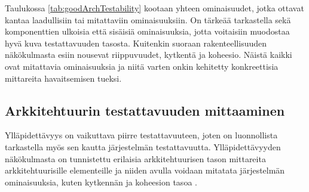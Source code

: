 \documentclass[finnish]{tktltiki2}
\numberwithin{table}{section}
\theoremstyle{definition}
\theoremstyle{remark}
\begin{document}
\begin{table}[H]
	\centering
	\setlength{\extrarowheight}{10pt}%
	\caption{Hyvään testattavuuteen vaikuttavat ominaisuudet jaoteltuna kahteen eri luokaan: laadulliset ja metriset.}
	\label{tab:goodArchTestability}
\end{table}

\noindent
Taulukossa \ref{tab:goodArchTestability} kootaan yhteen ominaisuudet, jotka ottavat kantaa laadullisiin tai mitattaviin ominaisuuksiin. On tärkeää tarkastella sekä komponenttien ulkoisia että sisäisiä ominaisuuksia, jotta voitaisiin muodostaa hyvä kuva testattavuuden tasosta. Kuitenkin suoraan rakenteellisuuden näkökulmasta esiin nousevat riippuvuudet, kytkentä ja koheesio. Näistä kaikki ovat mitattavia ominaisuuksia ja niitä varten onkin kehitetty konkreettisia mittareita havaitsemisen tueksi.  


\subsection{Arkkitehtuurin testattavuuden mittaaminen} \label{arch_testability_measurement}

Ylläpidettävyys on vaikuttava piirre testattavuuteen, joten on luonnollista tarkastella myös sen kautta järjestelmän testattavuutta. Ylläpidettävyyden näkökulmasta on tunnistettu erilaisia arkkitehtuurisen tason mittareita arkkitehtuurisille elementeille ja niiden avulla voidaan mitatata järjestelmän ominaisuuksia, kuten kytkennän ja koheesion tasoa \citep{bengtsson1998towards}.  

\iffalse


\begin{itemize}
	\item metodien määrä elementin rajapinnassa
	\item paikkamerkkien (placeholder) määrä arkkitehtuurisille elementeille, joiden avulla elementti parametrisoidaan
	\item elementistä lähtevien viestien määrä
	\item elementtityyppien määrä, joita tarkasteltava elementti toteuttaa (implement)
	\item elementtien määrä, jotka toteuttavat tarkasteltavan elementin tyypin
	\item saatavilla olevien metodien lukumäärä muista elementeistä, jotka ovat yhteydessä tarkasteltavaan elementtiin
	\item elementin metodien ja parametrien määrä
\end{itemize}
\fi
\end{document}
